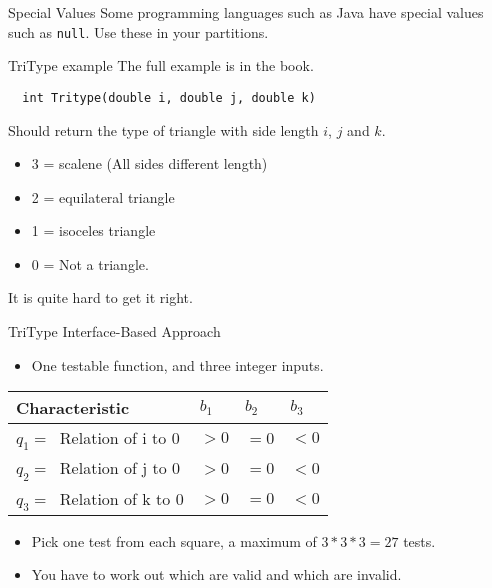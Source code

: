 \documentclass{beamer}
\newcommand{\pauseslide}{}
\begin{document}
\begin{frame}{Special Values}
  Some programming languages such as Java have special values such as
  {\tt null}. Use these in your partitions. 
\end{frame}
\pauseslide

\begin{frame}[fragile]{TriType example}
The full example is in the book.
  \begin{lstlisting}
  int Tritype(double i, double j, double k)
  \end{lstlisting}
Should return  the type of triangle with side length $i$, $j$ and $k$.
  \begin{itemize}
  \item 3 = scalene (All sides different length)
  \item 2 = equilateral triangle
  \item 1 = isoceles triangle 
  \item 0 = Not a triangle.
  \end{itemize}
It is quite hard to get it right.
\end{frame}
\begin{frame}{TriType Interface-Based Approach}
  \begin{itemize}
  \item One testable function, and three integer inputs.
  \end{itemize}
  \begin{tabular}{||l|l|l|l||}
\hline 
 Characteristic & $b_1$ &  $b_2$ & $b_3$ \\ \hline
 $q_1 = \ $ Relation of i  to $0$ & $>0$ & $=0$ & $<0$ \\
 $q_2 = \ $ Relation of j  to $0$ & $>0$ & $=0$ & $<0$ \\
 $q_3 = \ $ Relation of k  to $0$ & $>0$ & $=0$ & $<0$ \\
\hline    
\end{tabular}
\begin{itemize}
\item Pick one test from each square, a maximum of $3*3*3=27$ tests. 
\item You have to work out which are valid and which are invalid.
\end{itemize}
\end{frame}
\end{document}
